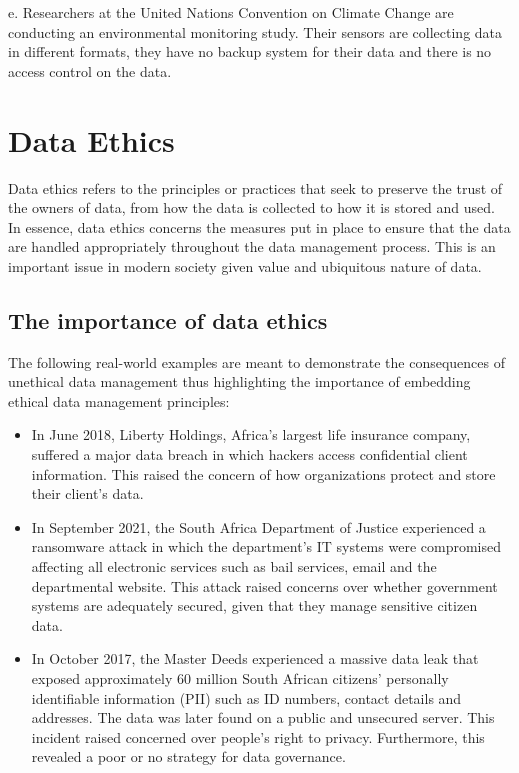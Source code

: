 \documentclass[
]{book}
\begin{document}
e. Researchers at the United Nations Convention on Climate Change are conducting an environmental monitoring study. Their sensors are collecting data in different formats, they have no backup system for their data and there is no access control on the data.

\section{Data Ethics}\label{sec1-4}

Data ethics refers to the principles or practices that seek to preserve the trust of the owners of data, from how the data is collected to how it is stored and used. In essence, data ethics concerns the measures put in place to ensure that the data are handled appropriately throughout the data management process. This is an important issue in modern society given value and ubiquitous nature of data.

\subsection{The importance of data ethics}\label{the-importance-of-data-ethics}

The following real-world examples are meant to demonstrate the consequences of unethical data management thus highlighting the importance of embedding ethical data management principles:

\begin{itemize}
\item
  In June 2018, Liberty Holdings, Africa's largest life insurance company, suffered a major data breach in which hackers access confidential client information. This raised the concern of how organizations protect and store their client's data.
\item
  In September 2021, the South Africa Department of Justice experienced a ransomware attack in which the department's IT systems were compromised affecting all electronic services such as bail services, email and the departmental website. This attack raised concerns over whether government systems are adequately secured, given that they manage sensitive citizen data.
\item
  In October 2017, the Master Deeds experienced a massive data leak that exposed approximately 60 million South African citizens' personally identifiable information (PII) such as ID numbers, contact details and addresses. The data was later found on a public and unsecured server. This incident raised concerned over people's right to privacy. Furthermore, this revealed a poor or no strategy for data governance.
\end{itemize}
\end{document}
